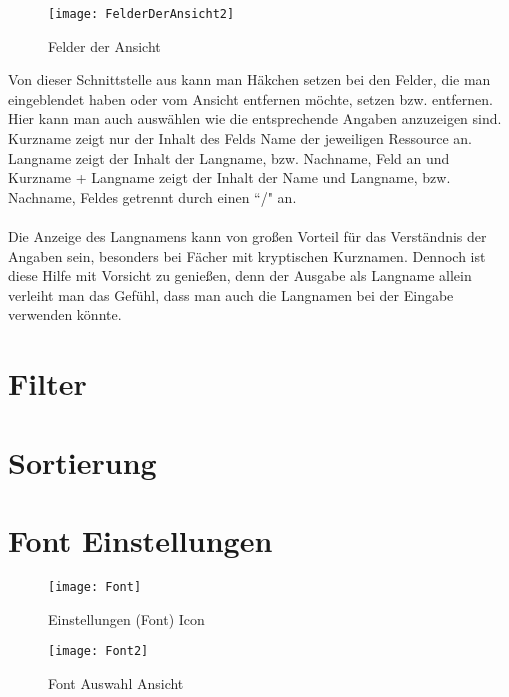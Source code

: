 \documentclass[]{report}
\begin{document}
\newpage
\begin{wrapfigure}{r}{0.4\textwidth}
	\texttt{[image: FelderDerAnsicht2]}
	\vspace{-15pt}
	\caption{Felder der Ansicht}
	\label{fig:fda2}
\end{wrapfigure}

\noindent
Von dieser Schnittstelle aus kann man Häkchen setzen bei den Felder, die man eingeblendet haben oder vom Ansicht entfernen möchte, setzen bzw. entfernen.  Hier kann man auch auswählen wie die entsprechende Angaben anzuzeigen sind. Kurzname zeigt nur der Inhalt des Felds Name der jeweiligen Ressource an. Langname zeigt der Inhalt der Langname, bzw. Nachname, Feld an und Kurzname + Langname zeigt der Inhalt der Name und Langname, bzw. Nachname, Feldes getrennt durch einen ``/" an.\\
\\
Die Anzeige des Langnamens kann von großen Vorteil für das Verständnis der Angaben sein, besonders bei Fächer mit kryptischen Kurznamen. Dennoch ist diese Hilfe mit Vorsicht zu genießen, denn der Ausgabe als Langname allein verleiht man das Gefühl, dass man auch die Langnamen bei der Eingabe verwenden könnte.

\section{Filter}

\section{Sortierung}

\section{Font Einstellungen}

\begin{wrapfigure}{r}{0.4\textwidth}
	\vspace{-15pt}
	\texttt{[image: Font]}
	\vspace{-15pt}
	\caption{Einstellungen (Font) Icon}
	\label{fig:font}
	\vspace{15pt}
	\texttt{[image: Font2]}
	\vspace{-15pt}
	\caption{Font Auswahl Ansicht}
	\label{fig:font2}
\end{wrapfigure}
\end{document}
